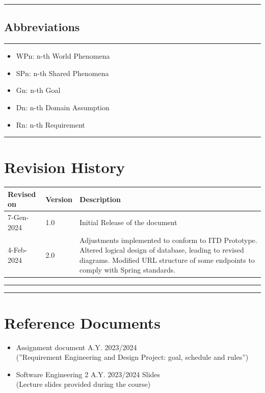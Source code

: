 \documentclass{Configuration_Files/Template}
\begin{document}
{\color{bluepoli}\rule{\linewidth}{0.1pt}}

\subsection{Abbreviations}

{\color{bluepoli}\rule{\linewidth}{0.1pt}}

\begin{itemize}
\item \textcolor{bluepoli}{WPn:} n-th World Phenomena
\item \textcolor{bluepoli}{SPn:} n-th Shared Phenomena
\item \textcolor{bluepoli}{Gn:} n-th Goal
\item \textcolor{bluepoli}{Dn:} n-th Domain Assumption
\item \textcolor{bluepoli}{Rn:} n-th Requirement
\end{itemize}

{\color{bluepoli}\rule{\linewidth}{0.1pt}}

\section{Revision History}

\noindent
\begin{tabularx}{\textwidth}{llX}
    \toprule
    Revised on & Version & Description \\
    \midrule
    7-Gen-2024 & 1.0 & Initial Release of the document \\
    \midrule
    4-Feb-2024 & 2.0 & Adjustments implemented to conform to ITD Prototype. Altered logical design of database, leading to revised diagrams. Modified URL structure of some endpoints to comply with Spring standards. \\
    \bottomrule
\end{tabularx}

{\color{bluepoli}\rule{\linewidth}{0.1pt}}

\newpage
{\color{bluepoli}\rule{\linewidth}{0.1pt}}
\section{Reference Documents}

\begin{itemize}
\item \textcolor{bluepoli}{Assignment document A.Y. 2023/2024}\\
(”Requirement Engineering and Design Project: goal, schedule and rules”)
\item \textcolor{bluepoli}{Software Engineering 2 A.Y. 2023/2024 Slides}\\
(Lecture slides provided during the course)
\end{itemize}
\end{document}
